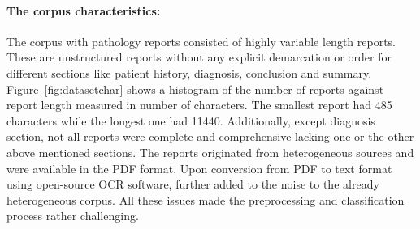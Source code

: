 \documentclass[runningheads]{llncs}
\begin{document}
\paragraph{The corpus characteristics:} The corpus with pathology reports consisted of highly variable length reports.
These are unstructured reports without any explicit demarcation or order for different sections like patient history, diagnosis, conclusion and summary.
Figure~\ref{fig:datasetchar} shows a histogram of the number of reports against report length measured in number of characters.
The smallest report had 485 characters while the longest one had 11440.
Additionally, except diagnosis section, not all reports were complete and comprehensive lacking one or the other above mentioned sections.
The reports originated from heterogeneous sources and were available in the PDF format.
Upon conversion from PDF to text format using open-source OCR software, further added to the noise to the already heterogeneous corpus.
All these issues made the preprocessing and classification process rather challenging.
\end{document}
